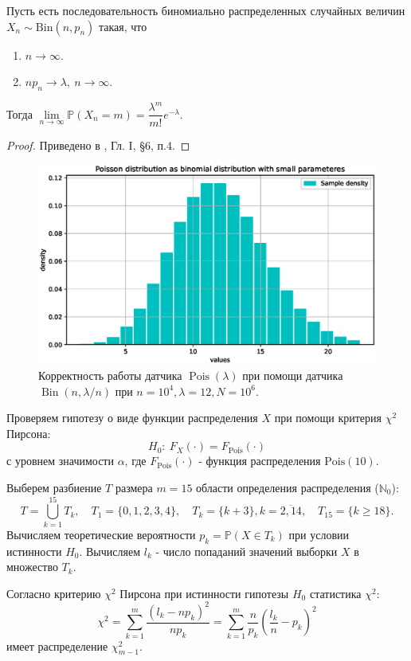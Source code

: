 \documentclass[11pt]{report}
\DeclareMathOperator{\Bin}{Bin}
\DeclareMathOperator{\Pois}{Pois}
\begin{document}
\begin{theorem}[Пуассон]
Пусть есть последовательность биномиально распределенных случайных величин $X_n\sim\mathrm{Bin}(n, p_n)$ такая, что
\begin{enumerate}
\item $n\to\infty$.
\item $np_n\to\lambda,~n\to\infty$.
\end{enumerate}
Тогда $\lim\limits_{n\to\infty}\mathbb{P}(X_n = m) = \dfrac{\lambda^m}{m!}e^{-\lambda}$.
\end{theorem}
\begin{proof}
Приведено в \cite{shiryaev-1}, Гл. I, §6, п.4.
\end{proof}

\begin{figure}[H]
    \centering
    \includegraphics[width=0.9\linewidth]{images/poisson-bin.eps}
    \caption{Корректность работы датчика $\Pois(\lambda)$ при помощи датчика $\Bin(n,\lambda/n)$ при $n=10^4,\lambda=12,N=10^6$.}
    \label{fig:poisson-bin}
\end{figure}

Проверяем гипотезу о виде функции распределения $X$ при помощи критерия $\chi^2$ Пирсона:
$$
H_0:~ F_X(\cdot) = F_{\operatorname{Pois}}(\cdot)
$$
с уровнем значимости $\alpha$, где $F_{\operatorname{Pois}}(\cdot)$ - функция распределения $\mathrm{Pois}(10)$.

Выберем разбиение $T$ размера $m=15$ области определения распределения ($\mathbb{N}_0$):
$$
T = \bigcup_{k=1}^{15} T_k,\quad
T_1 = \{0,1,2,3,4\},\quad T_k=\{k+3\},k=\overline{2,14},\quad
T_{15}=\{k\geqslant18\}.
$$
Вычисляем теоретические вероятности $p_k=\mathbb{P}(X \in T_k)$ при условии истинности $H_0$.
Вычисляем $l_k$ - число попаданий значений выборки $X$ в множество $T_k$.

Согласно критерию $\chi^2$ Пирсона при истинности гипотезы $H_0$ статистика $\chi^2$:
$$
\chi^2 = \sum^{m}_{k=1} \dfrac{(l_k - np_k)^2}{np_k} = \sum^{m}_{k=1}\dfrac{n}{p_k}\left( \dfrac{l_k}{n} - p_k \right)^2
$$
имеет распределение $\chi^2_{m-1}$.
\end{document}
